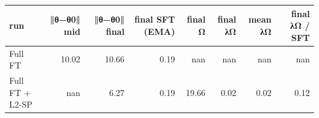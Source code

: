 \begin{tabular}{lrrrrrrr}
\toprule
run & ‖θ−θ0‖ mid & ‖θ−θ0‖ final & final SFT (EMA) & final Ω & final λΩ & mean λΩ & final λΩ / SFT \\
\midrule
Full FT & 10.02 & 10.66 & 0.19 & nan & nan & nan & nan \\
Full FT + L2-SP & nan & 6.27 & 0.19 & 19.66 & 0.02 & 0.02 & 0.12 \\
\bottomrule
\end{tabular}

